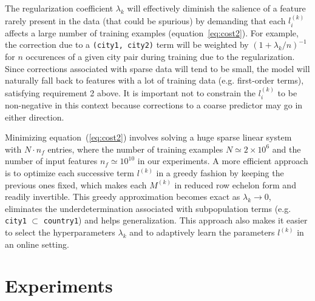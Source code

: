 \documentclass[10pt,a4paper,notitlepage,twocolumn]{article}
\begin{document}
The regularization coefficient $\lambda_k$ will effectively diminish the salience of a feature rarely present in the data (that could be spurious) by demanding that each $l_i^{(k)}$ affects a large number of training examples (equation~\ref{eq:cost2}).
For example, the correction due to a \texttt{(city1, city2)} term will be weighted by $(1+\lambda_k/n)^{-1}$ for $n$ occurences of a given city pair during training due to the regularization.
Since corrections associated with sparse data will tend to be small, the model will naturally fall back to features with a lot of training data (e.g. first-order terms), satisfying requirement 2 above.
It is important not to constrain the $l^{(k)}_i$ to be non-negative in this context because corrections to a coarse predictor may go in either direction.

Minimizing equation~(\ref{eq:cost2}) involves solving a huge sparse linear system with $N\cdot n_f$ entries, where the number of training examples $N\simeq 2\times 10^6$ and the number of input features $n_f\simeq10^{10}$ in our experiments.
A more efficient approach is to optimize each successive term $l^{(k)}$ in a greedy fashion by keeping the previous ones fixed, which makes each $M^{(k)}$ in reduced row echelon form and readily invertible.
This greedy approximation becomes exact as $\lambda_k\rightarrow 0$, eliminates the underdetermination associated with subpopulation terms (e.g. \texttt{city1} $\subset$ \texttt{country1}) and helps generalization.
This approach also makes it easier to select the hyperparameters $\lambda_k$ and to adaptively learn the parameters $l^{(k)}$ in an online setting.


\section{Experiments}
\end{document}
